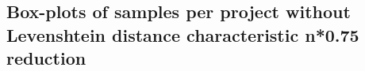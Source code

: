 \begin{appendices}
\chapter{Box-plots of samples per project without Levenshtein distance characteristic n*0.75 reduction}
\label{ap:no_distance_75}
\begin{figure}[h]
    \centering
    \qquad
\end{figure}


\end{appendices}

